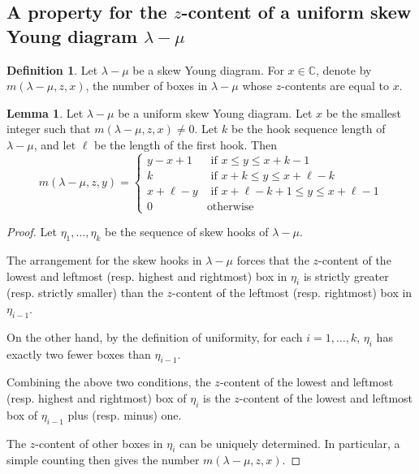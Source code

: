\documentclass[11pt]{amsart}
\numberwithin{equation}{section}
\theoremstyle{definition}
\newtheorem{lemma}[thm]{Lemma}
\newtheorem{definition}[thm]{Definition}
\begin{document}
\subsection{A property for the $z$-content of a uniform skew Young diagram $\lambda-\mu$}

\begin{definition}
Let $\lambda-\mu$ be a skew Young diagram. For $x \in \mathbb C$, denote by $m(\lambda-\mu, z,x)$, the number of boxes in $\lambda-\mu$ whose $z$-contents are equal to $x$.
\end{definition}

\begin{lemma} \label{lem multiplicity increase}
Let $\lambda-\mu$ be a uniform skew Young diagram. Let $x$ be the smallest integer such that $m(\lambda-\mu, z, x)\neq 0$. Let $k$ be the hook sequence length of $\lambda-\mu$, and let $\ell$ be the length of the first hook. Then
\[  m(\lambda-\mu, z, y) = \left\{ \begin{array}{cc}  y-x+1  & \mbox{ if $x\leq y \leq x+k-1$} \\ k & \mbox{ if $x+k \leq  y \leq x+\ell-k$}   \\  x+\ell -y  & \mbox{ if $x+\ell-k+1\leq y\leq  x+\ell-1$} \\ 0  & \mbox{otherwise} \end{array}  \right.
\]
\end{lemma}
\begin{proof}
Let $\eta_1,\ldots, \eta_k$ be the sequence of skew hooks of $\lambda-\mu$.

The arrangement for the skew hooks in $\lambda-\mu$ forces that the \(z\)-content of the lowest and leftmost (resp. highest and rightmost) box in $\eta_i$ is strictly greater (resp. strictly smaller) than the $z$-content of the leftmost (resp. rightmost) box in $\eta_{i-1}$. 

On the other hand, by the definition of uniformity, for each $i=1,\ldots, k$, $\eta_i$ has exactly two fewer boxes than $\eta_{i-1}$. 

Combining the above two conditions, the \(z\)-content of the lowest and leftmost (resp. highest and rightmost) box of \(\eta_i\) is  the \(z\)-content of the lowest and leftmost box of \(\eta_{i-1}\) plus (resp. minus) one. 

The $z$-content of other boxes in $\eta_i$ can be uniquely determined. In particular, a simple counting then gives the number \(m(\lambda-\mu, z, x)\).
\end{proof}
\end{document}
